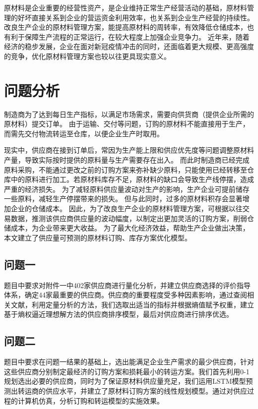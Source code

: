 
原材料是企业重要的经营性资产，是企业维持正常生产经营活动的基础，原材料管理的好坏直接关系到企业的营运资金利用效率，也关系到企业生产经营的持续性\cite{杨庆军2012浅谈}。
改良生产企业的原材料管理方案，能提高原材料的周转率，有效降低仓储成本，也有利于保障生产流程的正常运行，在较大程度上加强企业竞争力\cite{李红燕2018论企业原材料的管理和研究}。
近年来，随着经济的稳步发展，企业在面对新冠疫情冲击的同时，还面临着更大规模、更高强度的竞争，优化原材料管理方案也较以往更具现实意义。%

\section{问题分析}
制造商为了达到每日生产指标，以满足市场需求，需要向供货商（提供企业所需的原材料）提交订单。
由于运输、交付等问题，订购的原材料不能直接用于生产，而需先交付物流转运至仓库，以便企业生产时取用。

现实中，供应商在接到订单后，常因为生产能上限和供应优先度等问题调整原材料产量，导致实际按时提供的原料量与生产需要存在出入。
而此时制造商已经完成原料采购，不能通过更改之前的订购方案来弥补缺少原料，只能使用已经转移至仓库中的原料进行加工。若原材料库存不足，原材料的缺口会导致生产线停摆，造成严重的经济损失。
为了减轻原料供应量波动对生产的影响，生产企业可提前储存一些原料，减轻生产停摆带来的损失。
但与此同时，过多的原材料积存会显著增加企业的仓储成本。
因此，为了改良生产企业的原材料管理方案，可根据以往交易数据，推测该供应商供应量的波动幅度，以制定出更加灵活的订购方案，削弱仓储成本，为企业带来更大收益。
为了最大化经济效益，帮助生产企业做出决策，本文建立了供应量可预测的原材料订购、库存方案优化模型。

\subsection{问题一}
题目中要求对附件一中402家供应商进行量化分析，并建立供应商选择的评价指导体系，确定44家最重要的供应商。供应商的重要程度受多种因素影响，通过查阅相关文献，利用定量分析的方法，我们选取出适当的指标并根据熵值赋予权重，建立基于熵权逼近理想解方法的供应商排序模型，最后对供应商进行排序优选。


\subsection{问题二}
题目中要求在问题一结果的基础上，选出能满足企业生产需求的最少供应商，针对这些供应商分别制定最经济的订购方案和损耗最小的转运方案。我们首先利用0-1规划选出必要的供应商，同时为了保证原材料供应量充足，我们运用LSTM模型预测出转运商的供应水平，并建立了原材料订购方案的线性规划模型。通过对供应过程的计算机仿真，分析订购和转运模型的实施效果。

